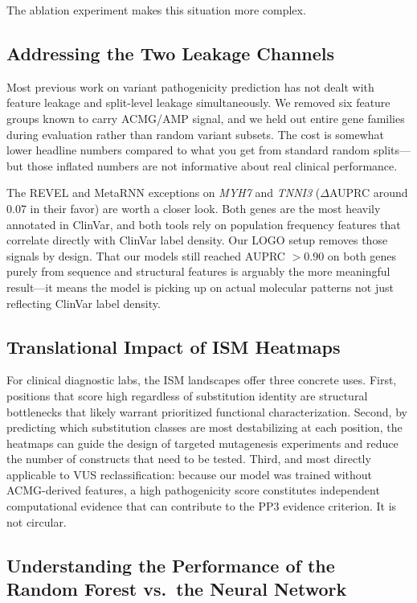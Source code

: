 \documentclass[conference]{IEEEtran}
\begin{document}
The ablation experiment makes this situation more complex.

\subsection{Addressing the Two Leakage Channels}

Most previous work on variant pathogenicity prediction has not dealt with feature leakage and split-level leakage simultaneously. We removed six feature groups known to carry ACMG/AMP signal, and we held out entire gene families during evaluation rather than random variant subsets. The cost is somewhat lower headline numbers compared to what you get from standard random splits---but those inflated numbers are not informative about real clinical performance.

The REVEL and MetaRNN exceptions on \textit{MYH7} and \textit{TNNI3} ($\Delta$AUPRC around 0.07 in their favor) are worth a closer look. Both genes are the most heavily annotated in ClinVar, and both tools rely on population frequency features that correlate directly with ClinVar label density. Our LOGO setup removes those signals by design. That our models still reached AUPRC $>0.90$ on both genes purely from sequence and structural features is arguably the more meaningful result---it means the model is picking up on actual molecular patterns not just reflecting ClinVar label density.

\subsection{Translational Impact of ISM Heatmaps}

For clinical diagnostic labs, the ISM landscapes offer three concrete uses. First, positions that score high regardless of substitution identity are structural bottlenecks that likely warrant prioritized functional characterization. Second, by predicting which substitution classes are most destabilizing at each position, the heatmaps can guide the design of targeted mutagenesis experiments and reduce the number of constructs that need to be tested. Third, and most directly applicable to VUS reclassification: because our model was trained without ACMG-derived features, a high pathogenicity score constitutes independent computational evidence that can contribute to the PP3 evidence criterion. It is not circular.

\subsection{Understanding the Performance of the Random Forest vs.\ the Neural Network}
\end{document}
